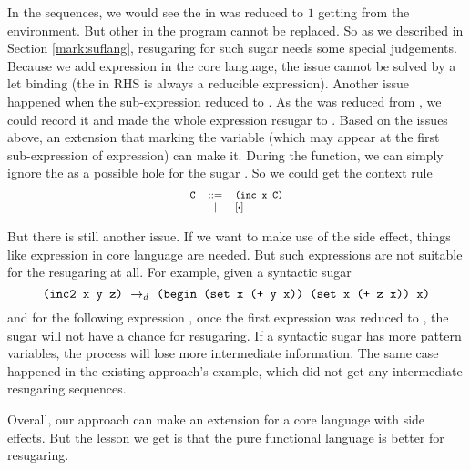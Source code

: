 In the sequences, we would see the  in  was reduced to $1$ getting from the environment. But other  in the program cannot be replaced. So as we described in Section \ref{mark:suflang}, resugaring for such sugar needs some special judgements. Because we add  expression in the core language, the issue cannot be solved by a let binding (the  in RHS is always a reducible expression).
Another issue happened when the sub-expression  reduced to . As the  was reduced from , we could record it and made the whole expression resugar to . Based on the issues above, an extension that marking the variable (which may appear at the first sub-expression of  expression) can make it. During the  function, we can simply ignore the  as a possible hole for the sugar . So we could get the context rule
\[
	{\footnotesize
	\begin{array}{lcl}
		\Code{C}&::=&\Code{(inc x C)}\\
		& | &[\bigcdot]
	\end{array}
	}
\]

But there is still another issue. If we want to make use of the side effect, things like  expression in core language are needed. But such expressions are not suitable for the resugaring at all. For example, given a syntactic sugar
\[\texttt{(inc2 x y z)} ~\rightarrow_d~ \texttt{(begin (set x (+ y x)) (set x (+ z x)) x)}\]
and for the following expression , once the first  expression was reduced to , the  sugar will not have a chance for resugaring. If a syntactic sugar has more pattern variables, the process will lose more intermediate information. The same case happened in the existing approach\cite{resugaring}'s  example, which did not get any intermediate resugaring sequences.

Overall, our approach can make an extension for a core language with side effects. But the lesson we get is that the pure functional language is better for resugaring.
